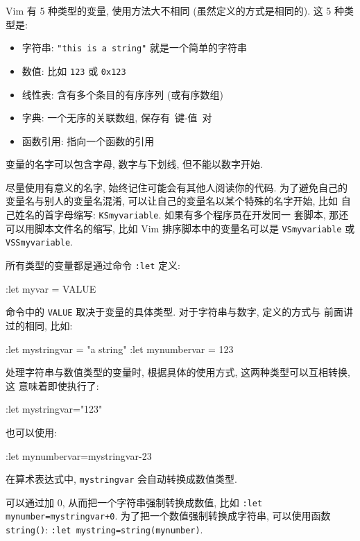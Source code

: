Vim 有 5 种类型的变量, 使用方法大不相同 (虽然定义的方式是相同的). 这 5 种类
型是:
\begin{itemize}
    \item 字符串: \texttt{"this is a string"} 就是一个简单的字符串
    \item 数值: 比如 \texttt{123} 或 \texttt{0x123}
    \item 线性表: 含有多个条目的有序序列 (或有序数组)
	\item 字典: 一个无序的关联数组, 保存有\ \mbox{键}-值\ 对
    \item 函数引用: 指向一个函数的引用
\end{itemize}

变量的名字可以包含字母, 数字与下划线, 但不能以数字开始.

\begin{warning}
    尽量使用有意义的名字, 始终记住可能会有其他人阅读你的代码. 为了避免自己的
    变量名与别人的变量名混淆, 可以让自己的变量名以某个特殊的名字开始, 比如
    自己姓名的首字母缩写: \texttt{KSmyvariable}. 如果有多个程序员在开发同一
    套脚本, 那还可以用脚本文件名的缩写, 比如 Vim 排序脚本中的变量名可以是
    \texttt{VSmyvariable} 或 \texttt{VSSmyvariable}.
\end{warning}

所有类型的变量都是通过命令 \texttt{:let} 定义:
\begin{vimcode}
:let myvar = VALUE
\end{vimcode}
命令中的 \texttt{VALUE} 取决于变量的具体类型. 对于字符串与数字, 定义的方式与
前面讲过的相同, 比如:
\begin{vimcode}
:let mystringvar = "a string"
:let mynumbervar = 123
\end{vimcode}
处理字符串与数值类型的变量时, 根据具体的使用方式, 这两种类型可以互相转换, 这
意味着即使执行了:
\begin{vimcode}
:let mystringvar="123"
\end{vimcode}
也可以使用:
\begin{vimcode}
:let mynumbervar=mystringvar-23
\end{vimcode}
在算术表达式中, \texttt{mystringvar} 会自动转换成数值类型.
\begin{warning}
    可以通过加 0, 从而把一个字符串强制转换成数值, 比如 \texttt{:let
    mynumber=mystringvar+0}. 为了把一个数值强制转换成字符串, 可以使用函数
    \texttt{string()}: \texttt{:let mystring=string(mynumber)}.
\end{warning}

